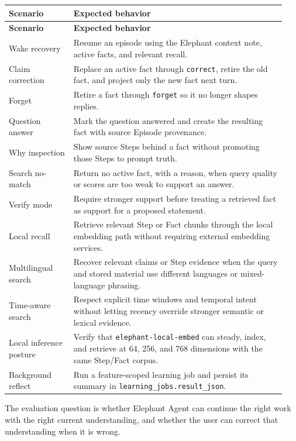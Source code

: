 \begingroup
\small
\setlength{\LTpre}{0.55em}
\setlength{\LTpost}{0.55em}
\begin{longtable}{@{}p{0.22\linewidth}p{0.72\linewidth}@{}}
\toprule
\textbf{Scenario} & \textbf{Expected behavior} \\
\midrule
\endfirsthead
\toprule
\textbf{Scenario} & \textbf{Expected behavior} \\
\midrule
\endhead
Wake recovery & Resume an episode using the Elephant context note, active facts,
and relevant recall. \\
Claim correction & Replace an active fact through \texttt{correct}, retire the
old fact, and project only the new fact next turn. \\
Forget & Retire a fact through \texttt{forget} so it no longer shapes replies. \\
Question answer & Mark the question answered and create the resulting fact
with source Episode provenance. \\
Why inspection & Show source Steps behind a fact without promoting those Steps
to prompt truth. \\
Search no-match & Return no active fact, with a reason, when query quality or
scores are too weak to support an answer. \\
Verify mode & Require stronger support before treating a retrieved fact as
support for a proposed statement. \\
Local recall & Retrieve relevant Step or Fact chunks through the local embedding
path without requiring external embedding services. \\
Multilingual search & Recover relevant claims or Step evidence when the query
and stored material use different languages or mixed-language phrasing. \\
Time-aware search & Respect explicit time windows and temporal intent without
letting recency override stronger semantic or lexical evidence. \\
Local inference posture & Verify that \texttt{elephant-local-embed} can steady,
index, and retrieve at 64, 256, and 768 dimensions with the same Step/Fact
corpus. \\
Background reflect & Run a feature-scoped learning job and persist its summary
in \texttt{learning\_jobs.result\_json}. \\
\bottomrule
\end{longtable}
\endgroup

The evaluation question is whether Elephant Agent can continue the right work with the
right current understanding, and whether the user can correct that
understanding when it is wrong.


